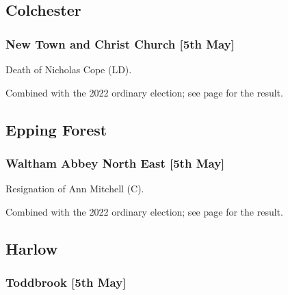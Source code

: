 \documentclass[a4paper,openany]{book}
\begin{document}
\begin{resultsiii}
\subsection*{Colchester}

\subsubsection*{New Town and Christ Church \hspace*{\fill}\nolinebreak[1]%
	\enspace\hspace*{\fill}
	[5th May]}


Death of Nicholas Cope (LD).

Combined with the 2022 ordinary election; see page \pageref{ColchesterNewTownChristChurch} for the result.

\subsection*{Epping Forest}

\subsubsection*{Waltham Abbey North East \hspace*{\fill}\nolinebreak[1]%
	\enspace\hspace*{\fill}
	[5th May]}


Resignation of Ann Mitchell (C).

Combined with the 2022 ordinary election; see page \pageref{EppingForestWalthamAbbeyNorthEast} for the result.

\subsection*{Harlow}

\subsubsection*{Toddbrook \hspace*{\fill}\nolinebreak[1]%
	\enspace\hspace*{\fill}
	[5th May]}


\end{resultsiii}
\end{document}

